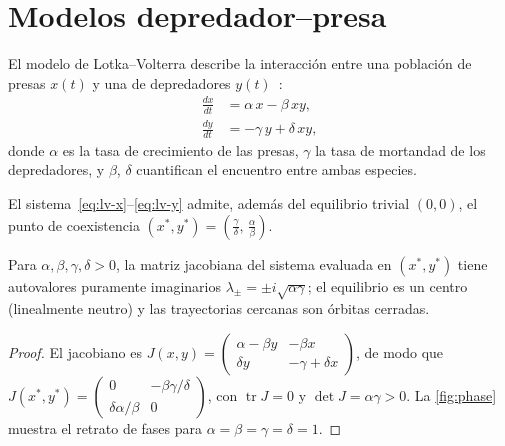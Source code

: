 
\section{Modelos depredador--presa}

El modelo de Lotka--Volterra describe la interacción entre una población de
presas $x(t)$ y una de depredadores $y(t)$~\cite{volterra1926,murray2002}:
\begin{align}
  \frac{dx}{dt} &= \alpha\, x - \beta\, x y, \label{eq:lv-x}\\[2pt]
  \frac{dy}{dt} &= -\gamma\, y + \delta\, x y, \label{eq:lv-y}
\end{align}
donde $\alpha$ es la tasa de crecimiento de las presas, $\gamma$ la tasa de
mortandad de los depredadores, y $\beta$, $\delta$ cuantifican el encuentro
entre ambas especies.

\begin{definition}
El sistema~\eqref{eq:lv-x}--\eqref{eq:lv-y} admite, además del
equilibrio trivial $(0,0)$, el punto de coexistencia
$(x^{*}, y^{*}) = \left(\tfrac{\gamma}{\delta},\, \tfrac{\alpha}{\beta}\right)$.
\end{definition}

\begin{theorem}
\label{thm:lv}
Para $\alpha, \beta, \gamma, \delta > 0$, la matriz jacobiana del sistema
evaluada en $(x^{*}, y^{*})$ tiene autovalores puramente imaginarios
$\lambda_{\pm} = \pm i \sqrt{\alpha \gamma}$; el equilibrio es un centro
(linealmente neutro) y las trayectorias cercanas son órbitas cerradas.
\end{theorem}

\begin{proof}
El jacobiano es
$J(x,y) = \begin{pmatrix} \alpha - \beta y & -\beta x \\ \delta y & -\gamma + \delta x \end{pmatrix}$,
de modo que $J(x^{*}, y^{*}) = \begin{pmatrix} 0 & -\beta\gamma/\delta \\ \delta\alpha/\beta & 0 \end{pmatrix}$,
con $\operatorname{tr} J = 0$ y $\det J = \alpha\gamma > 0$.
La \cref{fig:phase} muestra el retrato de fases para
$\alpha = \beta = \gamma = \delta = 1$.
\end{proof}

